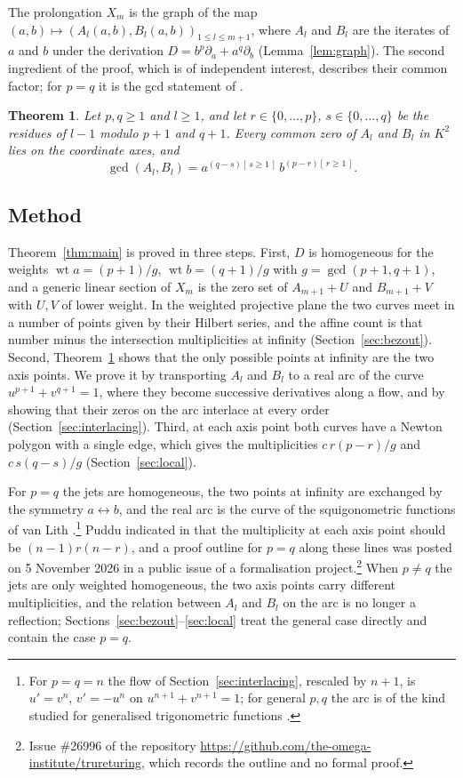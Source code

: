 \documentclass[11pt]{amsart}
\newtheorem{introthm}{Theorem}
\theoremstyle{definition}
\theoremstyle{remark}
\numberwithin{equation}{section}
\newcommand{\ind}[1]{[\,#1\,]}
\DeclareMathOperator{\wt}{wt}
\begin{document}
The prolongation $X_m$ is the graph of the map $(a,b)\mapsto(A_l(a,b),B_l(a,b))_{1\le l\le m+1}$, where $A_l$ and $B_l$ are the iterates of $a$ and $b$ under the derivation $D=b^p\partial_a+a^q\partial_b$ (Lemma~\ref{lem:graph}). The second ingredient of the proof, which is of independent interest, describes their common factor; for $p=q$ it is the gcd statement of \cite[Conjecture~4.1]{Pud26}.

\begin{introthm}\label{thm:gcd}
Let $p,q\ge1$ and $l\ge1$, and let $r\in\{0,\dots,p\}$, $s\in\{0,\dots,q\}$ be the residues of $l-1$ modulo $p+1$ and $q+1$. Every common zero of $A_l$ and $B_l$ in $K^2$ lies on the coordinate axes, and
\[
\gcd(A_l,B_l)=a^{(q-s)\ind{s\ge1}}\,b^{(p-r)\ind{r\ge1}}.
\]
\end{introthm}

\subsection*{Method}
Theorem~\ref{thm:main} is proved in three steps. First, $D$ is homogeneous for the weights $\wt a=(p+1)/g$, $\wt b=(q+1)/g$ with $g=\gcd(p+1,q+1)$, and a generic linear section of $X_m$ is the zero set of $A_{m+1}+U$ and $B_{m+1}+V$ with $U,V$ of lower weight. In the weighted projective plane the two curves meet in a number of points given by their Hilbert series, and the affine count is that number minus the intersection multiplicities at infinity (Section~\ref{sec:bezout}). Second, Theorem~\ref{thm:gcd} shows that the only possible points at infinity are the two axis points. We prove it by transporting $A_l$ and $B_l$ to a real arc of the curve $u^{p+1}+v^{q+1}=1$, where they become successive derivatives along a flow, and by showing that their zeros on the arc interlace at every order (Section~\ref{sec:interlacing}). Third, at each axis point both curves have a Newton polygon with a single edge, which gives the multiplicities $c\,r(p-r)/g$ and $c\,s(q-s)/g$ (Section~\ref{sec:local}).

For $p=q$ the jets are homogeneous, the two points at infinity are exchanged by the symmetry $a\leftrightarrow b$, and the real arc is the curve of the squigonometric functions of van Lith \cite{vL25}.\footnote{For $p=q=n$ the flow of Section~\ref{sec:interlacing}, rescaled by $n+1$, is $u'=v^n$, $v'=-u^n$ on $u^{n+1}+v^{n+1}=1$; for general $p,q$ the arc is of the kind studied for generalised trigonometric functions \cite{EGL12}.} Puddu indicated in \cite[Section~4]{Pud26} that the multiplicity at each axis point should be $(n-1)r(n-r)$, and a proof outline for $p=q$ along these lines was posted on 5 November 2026 in a public issue of a formalisation project.\footnote{Issue \#26996 of the repository \url{https://github.com/the-omega-institute/trureturing}, which records the outline and no formal proof.} When $p\neq q$ the jets are only weighted homogeneous, the two axis points carry different multiplicities, and the relation between $A_l$ and $B_l$ on the arc is no longer a reflection; Sections~\ref{sec:bezout}--\ref{sec:local} treat the general case directly and contain the case $p=q$.
\end{document}
